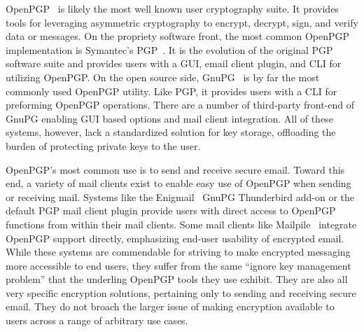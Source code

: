 OpenPGP~\cite{openpgp} is likely the most well known user cryptography
suite. It provides tools for leveraging asymmetric cryptography to
encrypt, decrypt, sign, and verify data or messages. On the propriety
software front, the most common OpenPGP implementation is Symantec's
PGP~\cite{pgp}. It is the evolution of the original PGP software suite
and provides users with a GUI, email client plugin, and CLI for
utilizing OpenPGP. On the open source side, GnuPG~\cite{gnupg} is by
far the most commonly used OpenPGP utility. Like PGP, it provides
users with a CLI for preforming OpenPGP operations. There are a number
of third-party front-end of GnuPG enabling GUI based options and mail
client integration. All of these systems, however, lack a standardized
solution for key storage, offloading the burden of protecting private
keys to the user.

OpenPGP's most common use is to send and receive secure email. Toward
this end, a variety of mail clients exist to enable easy use of
OpenPGP when sending or receiving mail. Systems like the
Enigmail~\cite{enigmail} GnuPG Thunderbird add-on or the default PGP
mail client plugin provide users with direct access to OpenPGP
functions from within their mail clients. Some mail clients like
Mailpile~\cite{mailpile} integrate OpenPGP support directly,
emphasizing end-user usability of encrypted email. While these systems
are commendable for striving to make encrypted messaging more
accessible to end users, they suffer from the same ``ignore key
management problem'' that the underling OpenPGP tools they use
exhibit. They are also all very specific encryption solutions,
pertaining only to sending and receiving secure email. They do not
broach the larger issue of making encryption available to users across
a range of arbitrary use cases.

